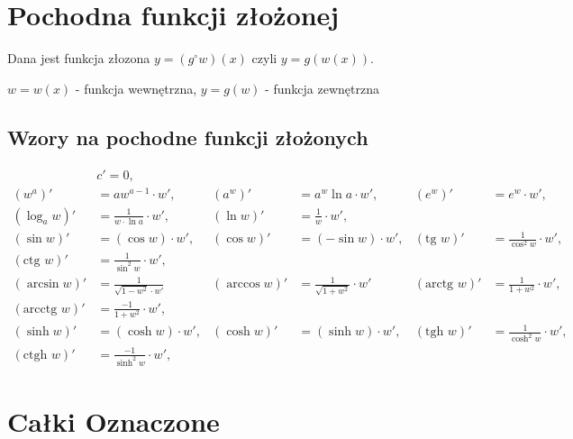 \documentclass[11pt]{article}
\begin{document}
\section{Pochodna funkcji złożonej}
\label{sec:org089992a}
Dana jest funkcja złozona \(y = (g^\circ w)(x)\) czyli \(y = g(w(x))\).
\begin{center}
\(w = w(x)\) - funkcja wewnętrzna, \qquad \(y = g(w)\) - funkcja zewnętrzna
\end{center}
\subsection{Wzory na pochodne funkcji złożonych}
\label{sec:org6c56ba1}
\begin{align*}
  & c' = 0,
  \\ \left(w^{a}\right)'&= a w^{a-1} \cdot w',
                        & \left(a^{w} \right)' &= a^{w} \ln a \cdot w',
                                               & \left( e^{w} \right)' &= e^{w} \cdot w',
  \\ \left(\log_{a}w \right)' &= \frac{1}{w \cdot \ln a} \cdot w',
                        & \left( \ln w \right)' &= \frac{1}{w} \cdot w',
  \\ \left( \sin w \right)' &= (\cos w) \cdot w',
                        & \left( \cos w \right)' &= (- \sin w) \cdot w',
                                               & \left( \text{tg } w \right)' &= \frac{1}{\cos^{2} w} \cdot w' ,
  \\ \left(\text{ctg } w \right)' &= \frac{1}{\sin^{2} w} \cdot w',
  \\  \left( \arcsin w \right)' &= \frac{1}{\sqrt{1-w^{2}} \cdot w'}
                        & \left(\arccos w \right)' &=\frac{1}{\sqrt{1+w^{2}}} \cdot w'
                                               & \left( \text{arctg } w \right)' &= \frac{1}{1+w^{2}} \cdot w',
  \\ \left( \text{arcctg } w \right)' &= \frac{-1}{1+w^{2}} \cdot w',
  \\  \left( \sinh w \right )' &=  (\cosh w) \cdot w' ,
                        & \left( \cosh w \right )' &= (\sinh w) \cdot w',
                                               & \left( \text{tgh } w \right )' &= \frac{1}{\cosh^{2} w} \cdot w',
  \\ \left( \text{ctgh } w \right )' &= \frac{-1}{\sinh ^{2} w} \cdot w',
\end{align*}

\section{Całki Oznaczone}
\label{sec:org959efb5}
\end{document}
